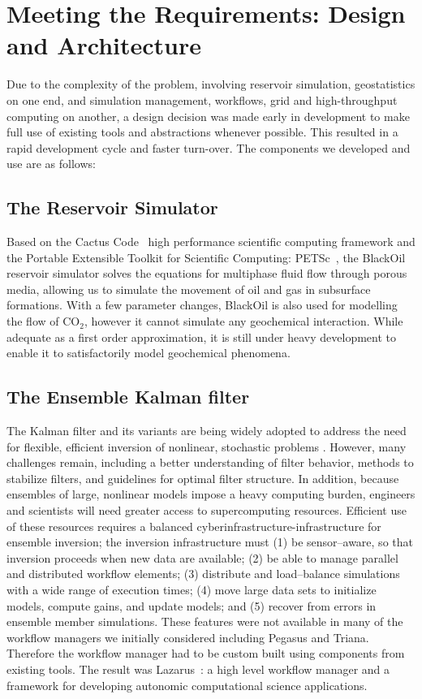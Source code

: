 \documentclass{acm_proc_article-sp}
\begin{document}
\section{Meeting the Requirements: Design and Architecture}

Due to the complexity of the problem, involving reservoir simulation,
geostatistics on one end, and simulation management, workflows, grid
and high-throughput computing on another, a design decision was made
early in development to make full use of existing tools and
abstractions whenever possible. This resulted in a rapid development
cycle and faster turn-over. The components we developed and use are as
follows:

\subsection{The Reservoir Simulator} 

Based on the Cactus Code~\cite{cactus_web} high performance
scientific computing framework and the Portable Extensible Toolkit for
Scientific Computing: PETSc~\cite{PETSc}, the BlackOil reservoir
simulator solves the equations for multiphase fluid flow through
porous media, allowing us to simulate the movement of oil and gas in
subsurface formations. With a few parameter changes, BlackOil is also
used for modelling the flow of CO$_2$, however it cannot simulate any
geochemical interaction. While adequate as a first order
approximation, it is still under heavy development to enable it to
satisfactorily model geochemical phenomena.

\subsection{The Ensemble Kalman filter} 

The Kalman filter and its variants are being widely adopted to address
the need for flexible, efficient inversion of nonlinear, stochastic
problems \cite{DataAssim}. However, many challenges remain,
including a better understanding of filter behavior, methods to
stabilize filters, and guidelines for optimal filter structure. In
addition, because ensembles of large, nonlinear models impose a heavy
computing burden, engineers and scientists will need greater access to
supercomputing resources. Efficient use of these resources requires a
balanced cyberinfrastructure-infrastructure for ensemble inversion; the inversion
infrastructure must (1) be sensor--aware, so that inversion proceeds
when new data are available; (2) be able to manage parallel and
distributed workflow elements; (3) distribute and load--balance
simulations with a wide range of execution times; (4) move large data
sets to initialize models, compute gains, and update models; and (5)
recover from errors in ensemble member simulations. These features
were not available in many of the workflow managers we initially considered
including Pegasus and Triana. Therefore
the workflow manager had to be custom built using components from existing
tools. The result was Lazarus~\cite{gmac}: a high level workflow manager
and a framework for developing autonomic computational science applications.
\end{document}
